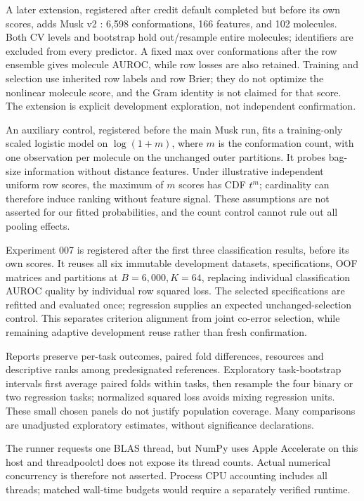 A later extension, registered after credit default completed but before its own
scores, adds Musk v2 \citep{musk1994}: 6,598 conformations, 166 features, and
102 molecules. Both CV levels and bootstrap hold out/resample entire molecules;
identifiers are excluded from every predictor. A fixed max over conformations
after the row ensemble gives molecule AUROC, while row losses are also retained.
Training and selection use inherited row labels and row Brier; they do not optimize
the nonlinear molecule score, and the Gram identity is not claimed for that score.
The extension is explicit development exploration, not independent confirmation.

An auxiliary control, registered before the main Musk run, fits a training-only
scaled logistic model on $\log(1+m)$, where $m$ is the conformation count, with
one observation per molecule on the unchanged outer partitions. It probes bag-size
information without distance features. Under illustrative independent uniform
row scores, the maximum of $m$ scores has CDF $t^m$; cardinality can therefore
induce ranking without feature signal. These assumptions are not asserted for
our fitted probabilities, and the count control cannot rule out all pooling effects.

Experiment 007 is registered after the first three classification results, before
its own scores. It reuses all six immutable development datasets, specifications,
OOF matrices and partitions at $B=6,000,K=64$, replacing individual classification
AUROC quality by individual row squared loss. The selected specifications are
refitted and evaluated once; regression supplies an expected unchanged-selection
control. This separates criterion alignment from joint co-error selection, while
remaining adaptive development reuse rather than fresh confirmation.

Reports preserve per-task outcomes, paired fold differences, resources and
descriptive ranks among predesignated references. Exploratory task-bootstrap
intervals first average paired folds within tasks, then resample the four binary
or two regression tasks; normalized squared loss avoids mixing regression units.
These small chosen panels do not justify population coverage. Many comparisons
are unadjusted exploratory estimates, without significance declarations.

The runner requests one BLAS thread, but NumPy uses Apple Accelerate on this
host and threadpoolctl does not expose its thread counts. Actual numerical
concurrency is therefore not asserted. Process CPU accounting includes all
threads; matched wall-time budgets would require a separately verified runtime.

